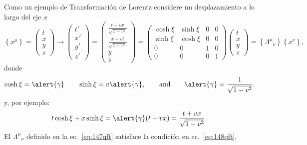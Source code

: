 Como un ejemplo de Transformación de Lorentz considere un desplazamiento a lo largo del eje $x$
\begin{equation}
\label{eq:147qft}
  \left\{x^\mu\right\}=\begin{pmatrix}
    t\\
    x\\
    y\\
    z
  \end{pmatrix}\to
  \begin{pmatrix}
    t'\\
    x'\\
    y'\\
    z'
  \end{pmatrix}=
  \begin{pmatrix}
    \frac{t+vx}{\sqrt{1-v^2}}\\
    \frac{x+vt}{\sqrt{1-v^2}}\\
    y\\
    z
  \end{pmatrix}=
  \begin{pmatrix}
    \cosh\xi&\sinh\xi&0&0\\
    \sinh\xi&\cosh\xi&0&0\\
    0     &  0  &1&0\\
    0     &  0  &0&1
  \end{pmatrix}
  \begin{pmatrix}
    t\\
    x\\
    y\\
    z
  \end{pmatrix}=\left\{{\Lambda^\mu}_{\nu}\right\}\left\{x^\nu\right\},
\end{equation}
donde
\begin{equation}
  \cosh\xi=\alert{\gamma}\qquad\sinh\xi=v\alert{\gamma},\qquad\text{and}\qquad \alert{\gamma}=\frac{1}{\sqrt{1-v^2}}.
\end{equation}
y, por ejemplo:
\begin{align}
  t\cosh{\xi}+x\sinh\xi=\alert{\gamma}(t+v x)=\frac{t+v x}{\sqrt{1-v^2}}\,.
\end{align}
El ${\Lambda^\mu}_{\nu}$ definido en la ec.~\eqref{eq:147qft} satisface la condición en ec.~\eqref{eq:148qft}, 
